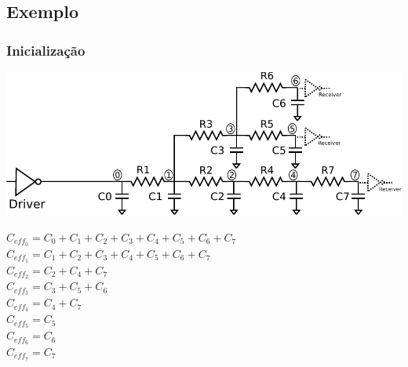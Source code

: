 \documentclass[10pt,a4paper]{beamer}
\begin{document}
\begin{frame}[t]
\begin{center}
\begin{columns}
\begin{column}{0.37\textwidth}
					\end{column}
				\end{columns}
			\end{center}
		\end{frame}


		\subsection*{Exemplo}

		\begin{frame}[t]
			\frametitle{Inicialização}
			\vspace{-0.25cm}
			\begin{center}
				\includegraphics[width=0.8\linewidth]{img/inicializacao1.pdf}
			\end{center}
			\vspace{0.25cm}
			$C_{eff_0} = C_0 + C_1 + C_2 + C_3 + C_4 + C_5 + C_6 + C_7$ \\
			$C_{eff_1} = C_1 + C_2 + C_3 + C_4 + C_5 + C_6 + C_7$ \\
			$C_{eff_2} = C_2 + C_4 + C_7$ \\
			$C_{eff_3} = C_3 + C_5 + C_6$ \\
			$C_{eff_4} = C_4 + C_7$ \\
			$C_{eff_5} = C_5$ \\
			$C_{eff_6} = C_6$ \\
			$C_{eff_7} = C_7$
		\end{frame}
\end{document}
